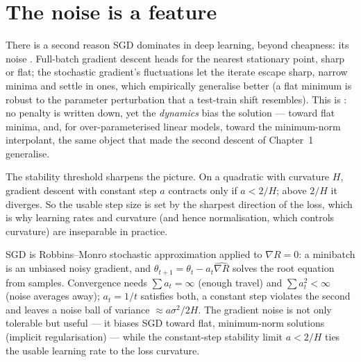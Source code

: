 \documentclass[11pt]{article}
\begin{document}
\section{The noise is a feature}

There is a second reason SGD dominates in deep learning, beyond cheapness: its
noise . Full-batch gradient descent heads for the nearest
stationary point, sharp or flat; the stochastic gradient's fluctuations let the
iterate escape sharp, narrow minima and settle in  ones, which
empirically generalise better (a flat minimum is robust to the parameter
perturbation that a test-train shift resembles). This is : no penalty is written down, yet the \emph{dynamics} bias the
solution --- toward flat minima, and, for over-parameterised linear models,
toward the minimum-norm interpolant, the same object that made the second
descent of Chapter~1 generalise.

The stability threshold sharpens the picture. On a quadratic with curvature $H$,
gradient descent with constant step $a$ contracts only if $a < 2/H$; above
$2/H$ it diverges. So the usable step size is set by the sharpest direction of
the loss, which is why learning rates and curvature (and hence normalisation,
which controls curvature) are inseparable in practice.

\begin{summarybox}
SGD is Robbins--Monro stochastic approximation applied to $\nabla R=0$: a
minibatch is an unbiased noisy gradient, and $\theta_{t+1}=\theta_t-a_t
\widehat{\nabla R}$ solves the root equation from samples. Convergence needs
$\sum a_t=\infty$ (enough travel) and $\sum a_t^2<\infty$ (noise averages away);
$a_t=1/t$ satisfies both, a constant step violates the second and leaves a noise
ball of variance $\approx a\sigma^2/2H$. The gradient noise is not only
tolerable but useful --- it biases SGD toward flat, minimum-norm solutions
(implicit regularisation) --- while the constant-step stability limit $a<2/H$
ties the usable learning rate to the loss curvature.
\end{summarybox}
\end{document}
